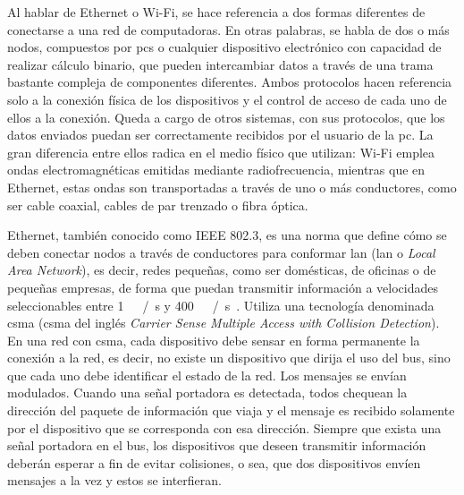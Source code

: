 Al hablar de Ethernet o Wi-Fi, se hace referencia a dos formas diferentes de conectarse a una red de computadoras. En otras palabras, se habla de dos o más nodos, compuestos por \acrshort{pc}s o cualquier dispositivo electrónico con capacidad de realizar cálculo binario, que pueden intercambiar datos a través de una trama bastante compleja de componentes diferentes. Ambos protocolos hacen referencia solo a la conexión física de los dispositivos y el control de acceso de cada uno de ellos a la conexión. Queda a cargo de otros sistemas, con sus protocolos, que los datos enviados puedan ser correctamente recibidos por el usuario de la \acrshort{pc}. La gran diferencia entre ellos radica en el medio físico que utilizan: Wi-Fi emplea ondas electromagnéticas emitidas mediante radiofrecuencia, mientras que en Ethernet, estas ondas son transportadas a través de uno o más conductores, como ser cable coaxial, cables de par trenzado o fibra óptica.%

Ethernet, también conocido como IEEE 802.3, es una norma que define cómo se deben conectar nodos a través de conductores para conformar \acrlong{lan} (\acrshort{lan} o {\it Local Area Network}), es decir, redes pequeñas, como ser domésticas, de oficinas o de pequeñas empresas, de forma que puedan transmitir información a velocidades seleccionables entre \SI{1}{\mega\bit\slash\second} y \SI{400}{\giga\bit\slash\second}~\cite{Ethernet2018}. Utiliza una tecnología denominada \acrlong{csma} (\acrshort{csma} del inglés {\it Carrier Sense Multiple Access with Collision Detection}). En una red con \acrshort{csma}, cada dispositivo debe sensar en forma permanente la conexión a la red, es decir, no existe un dispositivo que dirija el uso del bus, sino que cada uno debe identificar el estado de la red. Los mensajes se envían modulados. Cuando una señal portadora es detectada, todos chequean la dirección del paquete de información que viaja y el mensaje es recibido solamente por el dispositivo que se corresponda con esa dirección. Siempre que exista una señal portadora en el bus, los dispositivos que deseen transmitir información deberán esperar a fin de evitar colisiones, o sea, que dos dispositivos envíen mensajes a la vez y estos se interfieran.%


